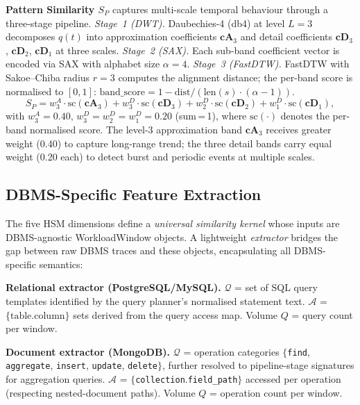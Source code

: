 \documentclass[10pt,twocolumn,a4paper]{article}
\newcommand{\SPER}{S_{P}}
\begin{document}
\textbf{Pattern Similarity $\SPER$} captures multi-scale temporal
behaviour through a three-stage pipeline. \emph{Stage~1 (DWT).}
Daubechies-4 (db4) at level $L\!=\!3$ decomposes $q(t)$ into
approximation coefficients $\mathbf{cA}_3$ and detail coefficients
$\mathbf{cD}_3$, $\mathbf{cD}_2$, $\mathbf{cD}_1$ at three scales.
\emph{Stage~2 (SAX).} Each sub-band coefficient vector
is encoded via SAX with alphabet size $\alpha\!=\!4$. \emph{Stage~3
(FastDTW).} FastDTW with Sakoe--Chiba radius $r\!=\!3$ computes the
alignment distance; the per-band score is normalised to $[0,1]$:
$\mathrm{band\_score}=1-\mathrm{dist}/({\mathrm{len}(s)\cdot(\alpha-1)})$.
\begin{equation}
  \SPER = w_3^A\!\cdot\!\mathrm{sc}(\mathbf{cA}_3)
         +w_3^D\!\cdot\!\mathrm{sc}(\mathbf{cD}_3)
         +w_2^D\!\cdot\!\mathrm{sc}(\mathbf{cD}_2)
         +w_1^D\!\cdot\!\mathrm{sc}(\mathbf{cD}_1),
\end{equation}
with $w_3^A\!=\!0.40$, $w_3^D\!=\!w_2^D\!=\!w_1^D\!=\!0.20$
(sum\,=\,1), where $\mathrm{sc}(\cdot)$ denotes the per-band normalised
score. The level-3 approximation band $\mathbf{cA}_3$ receives greater
weight (0.40) to capture long-range trend; the three detail bands carry
equal weight (0.20 each) to detect burst and periodic events at
multiple scales.

\subsection{DBMS-Specific Feature Extraction}\label{sec:extractor}

The five HSM dimensions define a \emph{universal similarity kernel}
whose inputs are DBMS-agnostic WorkloadWindow objects.
A lightweight \emph{extractor} bridges the gap between raw DBMS traces
and these objects, encapsulating all DBMS-specific semantics:

\smallskip
\noindent\textbf{Relational extractor (PostgreSQL/MySQL).}
$\mathcal{Q}$ = set of SQL query templates identified by the query
planner's normalised statement text.
$\mathcal{A}$ = $\{\text{table}.\text{column}\}$ sets derived from the
query access map.
Volume $Q$ = query count per window.

\smallskip
\noindent\textbf{Document extractor (MongoDB).}
$\mathcal{Q}$ = operation categories $\{$\texttt{find}, \texttt{aggregate},
\texttt{insert}, \texttt{update}, \texttt{delete}$\}$, further resolved
to pipeline-stage signatures for aggregation queries.
$\mathcal{A}$ = $\{$\texttt{collection}.\texttt{field\_path}$\}$
accessed per operation (respecting nested-document paths).
Volume $Q$ = operation count per window.
\end{document}
